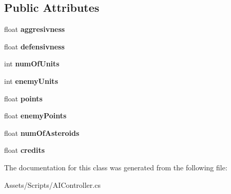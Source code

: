 \subsection*{Public Attributes}
\begin{DoxyCompactItemize}
\item 
\hypertarget{class_a_i_controller_1_1_a_i_state_ac322a22e73dd6159e83649fdb754e738}{}float {\bfseries aggresivness}\label{class_a_i_controller_1_1_a_i_state_ac322a22e73dd6159e83649fdb754e738}

\item 
\hypertarget{class_a_i_controller_1_1_a_i_state_a37bf9e7234c9d32f606b073cc20cf96a}{}float {\bfseries defensivness}\label{class_a_i_controller_1_1_a_i_state_a37bf9e7234c9d32f606b073cc20cf96a}

\item 
\hypertarget{class_a_i_controller_1_1_a_i_state_a8711f514c2794b832cced06277497d42}{}int {\bfseries num\+Of\+Units}\label{class_a_i_controller_1_1_a_i_state_a8711f514c2794b832cced06277497d42}

\item 
\hypertarget{class_a_i_controller_1_1_a_i_state_a7eec1e67aa6c7ddc07bf395bc87e0f88}{}int {\bfseries enemy\+Units}\label{class_a_i_controller_1_1_a_i_state_a7eec1e67aa6c7ddc07bf395bc87e0f88}

\item 
\hypertarget{class_a_i_controller_1_1_a_i_state_a6c47557910a46907b216f583aea42495}{}float {\bfseries points}\label{class_a_i_controller_1_1_a_i_state_a6c47557910a46907b216f583aea42495}

\item 
\hypertarget{class_a_i_controller_1_1_a_i_state_a800d73bdf57da35525bf0c48ba16566b}{}float {\bfseries enemy\+Points}\label{class_a_i_controller_1_1_a_i_state_a800d73bdf57da35525bf0c48ba16566b}

\item 
\hypertarget{class_a_i_controller_1_1_a_i_state_a156330391c48aead4c966159e13171b7}{}float {\bfseries num\+Of\+Asteroids}\label{class_a_i_controller_1_1_a_i_state_a156330391c48aead4c966159e13171b7}

\item 
\hypertarget{class_a_i_controller_1_1_a_i_state_a27c6681fb9475fe31d5b4f505b30e961}{}float {\bfseries credits}\label{class_a_i_controller_1_1_a_i_state_a27c6681fb9475fe31d5b4f505b30e961}

\end{DoxyCompactItemize}


The documentation for this class was generated from the following file\+:\begin{DoxyCompactItemize}
\item 
Assets/\+Scripts/A\+I\+Controller.\+cs\end{DoxyCompactItemize}
